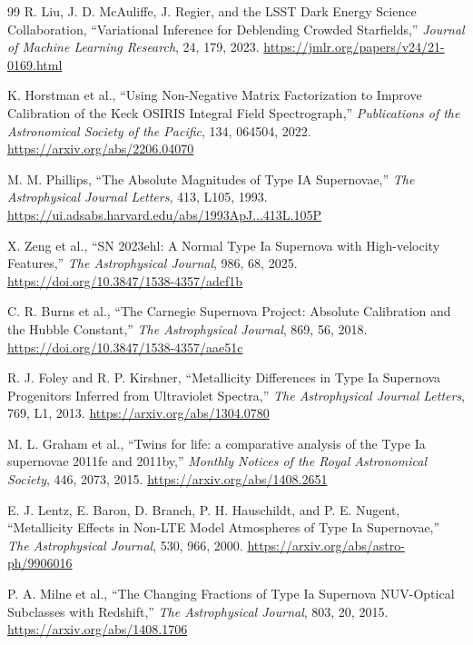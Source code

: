 \begin{thebibliography}{99}
R. Liu, J. D. McAuliffe, J. Regier, and the LSST Dark Energy Science Collaboration,
``Variational Inference for Deblending Crowded Starfields,''
\emph{Journal of Machine Learning Research}, 24, 179, 2023.
\url{https://jmlr.org/papers/v24/21-0169.html}

K. Horstman et al.,
``Using Non-Negative Matrix Factorization to Improve Calibration of the Keck OSIRIS Integral Field Spectrograph,''
\emph{Publications of the Astronomical Society of the Pacific}, 134, 064504, 2022.
\url{https://arxiv.org/abs/2206.04070}

M. M. Phillips,
``The Absolute Magnitudes of Type IA Supernovae,''
\emph{The Astrophysical Journal Letters}, 413, L105, 1993.
\url{https://ui.adsabs.harvard.edu/abs/1993ApJ...413L.105P}

X. Zeng et al.,
``SN 2023ehl: A Normal Type Ia Supernova with High-velocity Features,''
\emph{The Astrophysical Journal}, 986, 68, 2025.
\url{https://doi.org/10.3847/1538-4357/adcf1b}

C. R. Burns et al.,
``The Carnegie Supernova Project: Absolute Calibration and the Hubble Constant,''
\emph{The Astrophysical Journal}, 869, 56, 2018.
\url{https://doi.org/10.3847/1538-4357/aae51c}

R. J. Foley and R. P. Kirshner,
``Metallicity Differences in Type Ia Supernova Progenitors Inferred from Ultraviolet Spectra,''
\emph{The Astrophysical Journal Letters}, 769, L1, 2013.
\url{https://arxiv.org/abs/1304.0780}

M. L. Graham et al.,
``Twins for life: a comparative analysis of the Type Ia supernovae 2011fe and 2011by,''
\emph{Monthly Notices of the Royal Astronomical Society}, 446, 2073, 2015.
\url{https://arxiv.org/abs/1408.2651}

E. J. Lentz, E. Baron, D. Branch, P. H. Hauschildt, and P. E. Nugent,
``Metallicity Effects in Non-LTE Model Atmospheres of Type Ia Supernovae,''
\emph{The Astrophysical Journal}, 530, 966, 2000.
\url{https://arxiv.org/abs/astro-ph/9906016}

P. A. Milne et al.,
``The Changing Fractions of Type Ia Supernova NUV-Optical Subclasses with Redshift,''
\emph{The Astrophysical Journal}, 803, 20, 2015.
\url{https://arxiv.org/abs/1408.1706}


\end{thebibliography}
